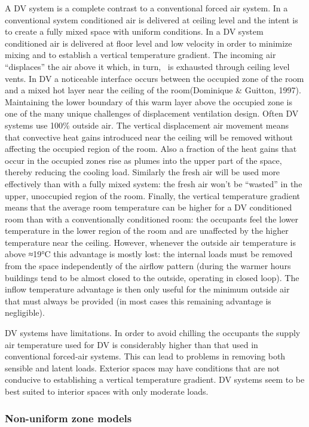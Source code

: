 A DV system is a complete contrast to a conventional forced air system. In a conventional system conditioned air is delivered at ceiling level and the intent is to create a fully mixed space with uniform conditions. In a DV system conditioned air is delivered at floor level and low velocity in order to minimize mixing and to establish a vertical temperature gradient. The incoming air ``displaces'' the air above it which, in turn,~ is exhausted through ceiling level vents. In DV a noticeable interface occurs between the occupied zone of the room and a mixed hot layer near the ceiling of the room(Dominique \& Guitton, 1997). Maintaining the lower boundary of this warm layer above the occupied zone is one of the many unique challenges of displacement ventilation design. Often DV systems use 100\% outside air. The vertical displacement air movement means that convective heat gains introduced near the ceiling will be removed without affecting the occupied region of the room. Also a fraction of the heat gains that occur in the occupied zones rise as plumes into the upper part of the space, thereby reducing the cooling load. Similarly the fresh air will be used more effectively than with a fully mixed system: the fresh air won't be ``wasted'' in the upper, unoccupied region of the room. Finally, the vertical temperature gradient means that the average room temperature can be higher for a DV conditioned room than with a conventionally conditioned room: the occupants feel the lower temperature in the lower region of the room and are unaffected by the higher temperature near the ceiling. However, whenever the outside air temperature is above ≈19°C this advantage is mostly lost: the internal loads must be removed from the space independently of the airflow pattern (during the warmer hours buildings tend to be almost closed to the outside, operating in closed loop). The inflow temperature advantage is then only useful for the minimum outside air that must always be provided (in most cases this remaining advantage is negligible).

DV systems have limitations. In order to avoid chilling the occupants the supply air temperature used for DV is considerably higher than that used in conventional forced-air systems. This can lead to problems in removing both sensible and latent loads. Exterior spaces may have conditions that are not conducive to establishing a vertical temperature gradient. DV systems seem to be best suited to interior spaces with only moderate loads.

\subsubsection{Non-uniform zone models}\label{non-uniform-zone-models}

